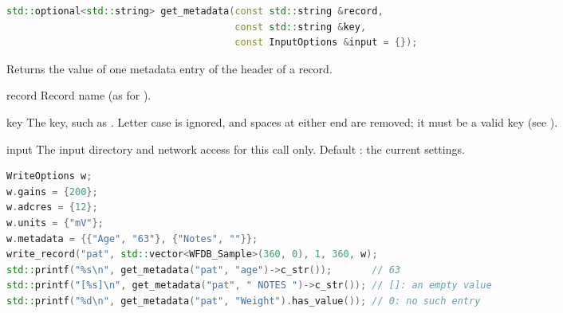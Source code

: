 \begin{lstlisting}[language=C++,style=signature]
std::optional<std::string> get_metadata(const std::string &record,
                                        const std::string &key,
                                        const InputOptions &input = {});
\end{lstlisting}
Returns the value of one metadata entry of the header of a record.
\begin{params}
\item[record] Record name (as for ).
\item[key] The key, such as . Letter case is ignored, and spaces at either end
  are removed; it must be a valid key (see ).
\item[input] The input directory and network access for this call only. Default
  \code{\{\}}: the current settings.
\end{params}
\begin{lstlisting}[language=C++,style=example]
WriteOptions w;
w.gains = {200};
w.adcres = {12};
w.units = {"mV"};
w.metadata = {{"Age", "63"}, {"Notes", ""}};
write_record("pat", std::vector<WFDB_Sample>(360, 0), 1, 360, w);
std::printf("%s\n", get_metadata("pat", "age")->c_str());       // 63
std::printf("[%s]\n", get_metadata("pat", " NOTES ")->c_str()); // []: an empty value
std::printf("%d\n", get_metadata("pat", "Weight").has_value()); // 0: no such entry
\end{lstlisting}


